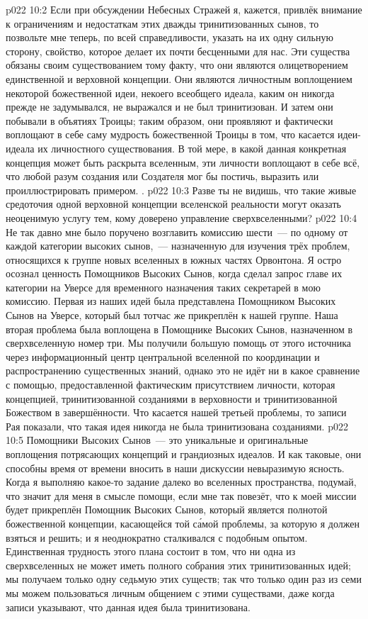 \vs p022 10:2 \pc Если при обсуждении Небесных Стражей я, кажется, привлёк внимание к ограничениям и недостаткам этих дважды тринитизованных сынов, то позвольте мне теперь, по всей справедливости, указать на их одну сильную сторону, свойство, которое делает их почти бесценными для нас. Эти существа обязаны своим существованием тому факту, что они являются олицетворением единственной и верховной концепции. Они являются личностным воплощением некоторой божественной идеи, некоего всеобщего идеала, каким он никогда прежде не задумывался, не выражался и не был тринитизован. И затем они побывали в объятиях Троицы; таким образом, они проявляют и фактически воплощают в себе саму мудрость божественной Троицы в том, что касается идеи\hyp{}идеала их личностного существования. В той мере, в какой данная конкретная концепция может быть раскрыта вселенным, эти личности воплощают в себе всё, что любой разум создания или Создателя мог бы постичь, выразить или проиллюстрировать примером. .
\vs p022 10:3 Разве ты не видишь, что такие живые средоточия одной верховной концепции вселенской реальности могут оказать неоценимую услугу тем, кому доверено управление сверхвселенными?
\vs p022 10:4 \pc Не так давно мне было поручено возглавить комиссию шести~--- по одному от каждой категории высоких сынов,~--- назначенную для изучения трёх проблем, относящихся к группе новых вселенных в южных частях Орвонтона. Я остро осознал ценность Помощников Высоких Сынов, когда сделал запрос главе их категории на Уверсе для временного назначения таких секретарей в мою комиссию. Первая из наших идей была представлена Помощником Высоких Сынов на Уверсе, который был тотчас же прикреплён к нашей группе. Наша вторая проблема была воплощена в Помощнике Высоких Сынов, назначенном в сверхвселенную номер три. Мы получили большую помощь от этого источника через информационный центр центральной вселенной по координации и распространению существенных знаний, однако это не идёт ни в какое сравнение с помощью, предоставленной фактическим присутствием личности, которая  концепцией, тринитизованной созданиями в верховности и тринитизованной Божеством в завершённости. Что касается нашей третьей проблемы, то записи Рая показали, что такая идея никогда не была тринитизована созданиями.
\vs p022 10:5 \pc Помощники Высоких Сынов~--- это уникальные и оригинальные воплощения потрясающих концепций и грандиозных идеалов. И как таковые, они способны время от времени вносить в наши дискуссии невыразимую ясность. Когда я выполняю какое\hyp{}то задание далеко во вселенных пространства, подумай, что значит для меня в смысле помощи, если мне так повезёт, что к моей миссии будет прикреплён Помощник Высоких Сынов, который является полнотой божественной концепции, касающейся той с\'амой проблемы, за которую я должен взяться и решить; и я неоднократно сталкивался с подобным опытом. Единственная трудность этого плана состоит в том, что ни одна из сверхвселенных не может иметь полного собрания этих тринитизованных идей; мы получаем только одну седьмую этих существ; так что только один раз из семи мы можем пользоваться личным общением с этими существами, даже когда записи указывают, что данная идея была тринитизована.
